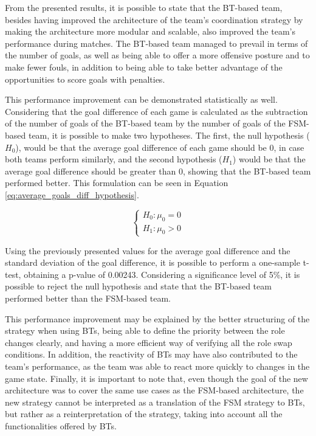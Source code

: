 From the presented results, it is possible to state that the BT-based team, besides having improved the architecture of the team's coordination strategy by making the architecture more modular and scalable, also improved the team's performance during matches. The BT-based team managed to prevail in terms of the number of goals, as well as being able to offer a more offensive posture and to make fewer fouls, in addition to being able to take better advantage of the opportunities to score goals with penalties.

This performance improvement can be demonstrated statistically as well. Considering that the goal difference of each game is calculated as the subtraction of the number of goals of the BT-based team by the number of goals of the FSM-based team, it is possible to make two hypotheses. The first, the null hypothesis ($H_0$), would be that the average goal difference of each game should be 0, in case both teams perform similarly, and the second hypothesis ($H_1$) would be that the average goal difference should be greater than 0, showing that the BT-based team performed better. This formulation can be seen in Equation \ref{eq:average_goals_diff_hypothesis}.

\begin{equation}
    \left\{
    \begin{aligned}
        H_0: \mu_0 = 0 \\
        H_1: \mu_0 > 0
    \end{aligned}
    \right.
    \label{eq:average_goals_diff_hypothesis}
\end{equation}

Using the previously presented values for the average goal difference and the standard deviation of the goal difference, it is possible to perform a one-sample t-test, obtaining a p-value of 0.00243. Considering a significance level of 5\%, it is possible to reject the null hypothesis and state that the BT-based team performed better than the FSM-based team.

This performance improvement may be explained by the better structuring of the strategy when using BTs, being able to define the priority between the role changes clearly, and having a more efficient way of verifying all the role swap conditions. In addition, the reactivity of BTs may have also contributed to the team's performance, as the team was able to react more quickly to changes in the game state. Finally, it is important to note that, even though the goal of the new architecture was to cover the same use cases as the FSM-based architecture, the new strategy cannot be interpreted as a translation of the FSM strategy to BTs, but rather as a reinterpretation of the strategy, taking into account all the functionalities offered by BTs.

